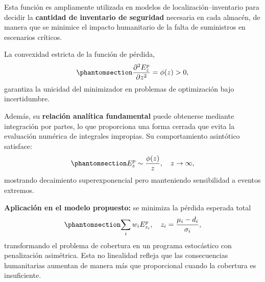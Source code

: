 \documentclass[
  spanish,
  us-letterpaper,
]{scrreprt}
\numberwithin{equation}{section}
\begin{document}
Esta función es ampliamente utilizada en modelos de
localización--inventario para decidir la \textbf{cantidad de inventario
de seguridad} necesaria en cada almacén, de manera que se minimice el
impacto humanitario de la falta de suministros en escenarios críticos.

La convexidad estricta de la función de pérdida,
\begin{equation}\phantomsection\label{eq-phi}{
\frac{\partial^2 E_z^p}{\partial z^2} = \phi(z) > 0,
}\end{equation} garantiza la unicidad del minimizador en problemas de
optimización bajo incertidumbre.

Además, su \textbf{relación analítica fundamental} puede obtenerse
mediante integración por partes, lo que proporciona una forma cerrada
que evita la evaluación numérica de integrales impropias. Su
comportamiento asintótico satisface:
\begin{equation}\phantomsection\label{eq-E_phi}{
E_z^p \sim \frac{\phi(z)}{z}, \quad z \to \infty,
}\end{equation} mostrando decaimiento superexponencial pero manteniendo
sensibilidad a eventos extremos.

\textbf{Aplicación en el modelo propuesto:} se minimiza la pérdida
esperada total \begin{equation}\phantomsection\label{eq-perdida}{
\sum_i w_i E_{z_i}^p, \quad z_i = \frac{\mu_i - d_i}{\sigma_i},
}\end{equation} transformando el problema de cobertura en un programa
estocástico con penalización asimétrica. Esta no linealidad refleja que
las consecuencias humanitarias aumentan de manera más que proporcional
cuando la cobertura es insuficiente.
\end{document}
